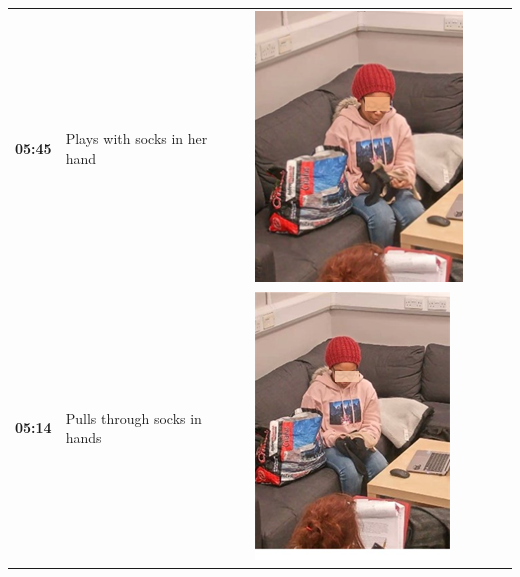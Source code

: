 \documentclass[twocolumn, issue, empirical, authordate,drafn]{jote-new-article}
\begin{document}
\begin{table}[ht!]
\begin{tabularx}{\linewidth}{@{} m{.05\linewidth} m{.2\linewidth} >{\raggedleft\arraybackslash}m{.19\linewidth}  m{.05\linewidth} m{.2\linewidth} >{\raggedleft\arraybackslash}m{.19\linewidth} }
 \textbf{05:45} & Plays with socks in her hand & \includegraphics[height=.15\textheight, width=.8\linewidth]{media/image12.png} \\
 \textbf{05:14} & Pulls through socks in hands & \includegraphics[height=.15\textheight, width=.8\linewidth]{media/image8.png} &

\end{tabularx}
\end{table}
\end{document}
